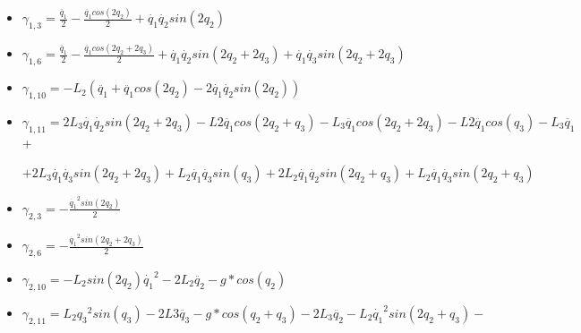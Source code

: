 \begin{itemize}
	
	\item $\gamma_{1,3}=\frac{\ddot{q_1}}{2} - \frac{\ddot{q_1}cos(2q_2)}{2} + \dot{q_1}\dot{q_2}sin(2q_2) $ \\ \vspace{0.2cm}
	
	\item $\gamma_{1,6}=\frac{\ddot{q_1}}{2} - \frac{\ddot{q_1}cos(2q_2 + 2q_3)}{2} +\dot{q_1}\dot{q_2}sin(2q_2 + 2q_3) + \dot{q_1}\dot{q_3}sin(2q_2 + 2q_3) $\\ \vspace{0.2cm}
	
	\item $\gamma_{1,10}=-L_{2}(\ddot{q_1} + \ddot{q_1}cos(2q_2) - 2\dot{q_1}\dot{q_2}sin(2q_2))$ \\ \vspace{0.2cm}
	
	\item  $\gamma_{1,11}=2L_3\dot{q_1}\dot{q_2}sin(2q_2 + 2q_3) - L2\ddot{q_1}cos(2q_2 + q_3) - L_{3}\ddot{q_1}cos(2q_2 + 2q_3) - L2\ddot{q_1}cos(q_3) - L_{3}\ddot{q_1}$ + \\ \vspace{0.1cm}
	
	$+2L_{3}\dot{q_1}\dot{q_3}sin(2q_2 + 2q_3) + L_{2}\dot{q_1}\dot{q_3}sin(q_3) + 2L_{2}\dot{q_1}\dot{q_2}sin(2q_2 + q_3) + L_{2}\dot{q_1}\dot{q_3}sin(2q_2 + q_3)$ \\ \vspace{0.2cm}
	
	\item $\gamma_{2,3}=-\frac{\dot{q_1}^{2}sin(2q_2)}{2} $\\ \vspace{0.2cm}
	
	\item $\gamma_{2,6}=-\frac{\dot{q_1}^{2}sin(2q_2 + 2q_3)}{2} $\\ \vspace{0.2cm}
	
	\item $\gamma_{2,10}= - L_{2}sin(2q_2)\dot{q_1}^{2} - 2L_{2}\ddot{q_2} - g*cos(q_2)$ \\ \vspace{0.2cm}
	
	\item $\gamma_{2,11}=  L_{2}{q_3}^{2}sin(q_3) - 2L3\ddot{q_3} - g*cos(q_2 + q_3) - 2L_{3}\ddot{q_2} - L_{2}\dot{q_1}^{2}sin(2q_2 + q_3) - $\\ \vspace{0.1cm}
	

\end{itemize}
